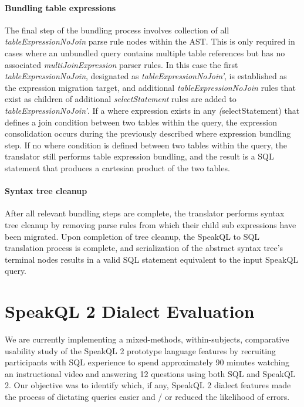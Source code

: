 \paragraph{Bundling table expressions}

The final step of the bundling process involves collection of all \emph{tableExpressionNoJoin} parse rule nodes within the AST. This is only required in cases where an unbundled query contains multiple table references but has no associated \emph{multiJoinExpression} parser rules. In this case the first \emph{tableExpressionNoJoin}, designated as \emph{tableExpressionNoJoin'}, is established as the expression migration target, and additional \emph{tableExpressionNoJoin} rules that exist as children of additional \emph{selectStatement} rules are added to \emph{tableExpressionNoJoin'}. If a where expression exists in any \emph(selectStatement) that defines a join condition between two tables within the query, the expression consolidation occurs during the previously described where expression bundling step. If no where condition is defined between two tables within the query, the translator still performs table expression bundling, and the result is a SQL statement that produces a cartesian product of the two tables.


\paragraph{Syntax tree cleanup}

After all relevant bundling steps are complete, the translator performs syntax tree cleanup by removing parse rules from which their child sub expressions have been migrated. Upon completion of tree cleanup, the SpeakQL to SQL translation process is complete, and serialization of the abstract syntax tree's terminal nodes results in a valid SQL statement equivalent to the input SpeakQL query.


\section{SpeakQL 2 Dialect Evaluation}


We are currently implementing a mixed-methods, within-subjects, comparative usability study of the SpeakQL 2 prototype language features by recruiting participants with SQL experience to spend approximately 90 minutes watching an instructional video and answering 12 questions using both SQL and SpeakQL 2. Our objective was to identify which, if any, SpeakQL 2 dialect features made the process of dictating queries easier and / or reduced the likelihood of errors.

